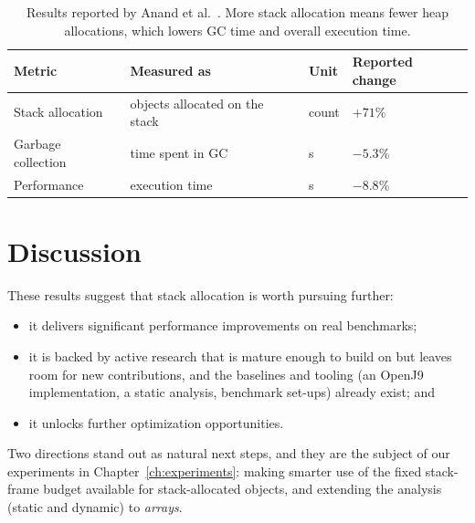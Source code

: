 \begin{table}[htbp]
  \centering
  \begin{tabular}{@{}llll@{}}
    \toprule
    Metric & Measured as & Unit & Reported change \\
    \midrule
    Stack allocation & objects allocated on the stack & count & $+71\%$ \\
    Garbage collection & time spent in GC & s & $-5.3\%$ \\
    Performance & execution time & s & $-8.8\%$ \\
    \bottomrule
  \end{tabular}
  \caption{Results reported by Anand et al.~\cite{anand2024optimistic}. More stack allocation means
           fewer heap allocations, which lowers GC time and overall execution time.}
  \label{tab:anand-eval}
\end{table}

\section{Discussion}

These results suggest that stack allocation is worth pursuing further:
\begin{itemize}
  \item it delivers significant performance improvements on real benchmarks;
  \item it is backed by active research that is mature enough to build on but leaves room for
        new contributions, and the baselines and tooling (an OpenJ9 implementation, a static
        analysis, benchmark set-ups) already exist; and
  \item it unlocks further optimization opportunities.
\end{itemize}
Two directions stand out as natural next steps, and they are the subject of our experiments in
Chapter~\ref{ch:experiments}: making smarter use of the fixed stack-frame budget available for
stack-allocated objects, and extending the analysis (static and dynamic) to \emph{arrays}.
